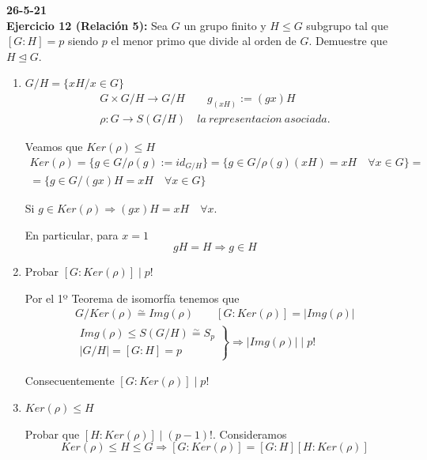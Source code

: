 \documentclass{article}
\begin{document}
\textbf{26-5-21} \\

\textbf{Ejercicio 12 (Relación 5):} Sea $G$ un grupo finito y $H\leq G$ subgrupo tal que $\left[G:H\right]=p$ siendo $p$ el menor primo que divide al orden de $G$. Demuestre que $H\unlhd G$.

\begin{enumerate}[1)]
\item $G/H=\{xH/x\in G\}$
\begin{gather*}
G\times G/H\longrightarrow G/H\qquad g_{(xH)}:=(gx)H \\
\rho:G\longrightarrow S(G/H) \quad la\:representacion\:asociada.
\end{gather*}

Veamos que $Ker(\rho)\leq H$
\begin{gather*}
Ker(\rho)=\{g\in G/\rho(g):=id_{G/H}\}=\{g\in G/\rho(g)(xH)=xH\quad \forall x\in G\}=\\
=\{g\in G/(gx)H=xH\quad \forall x\in G\}
\end{gather*}

Si $g\in Ker(\rho)\Rightarrow (gx)H=xH\quad \forall x$.

En particular, para $x=1$
\begin{equation*}
gH=H\Rightarrow g\in H
\end{equation*}

\item Probar $\left[G:Ker(\rho)\right]\mid p!$

Por el 1º Teorema de isomorfía tenemos que
\begin{gather*}
G/Ker(\rho)\overset{\sim}{=} Img(\rho) \qquad \left[G:Ker(\rho)\right]=|Img(\rho)| \\
\left.\begin{array}{c}
Img(\rho)\leq S(G/H)\overset{\sim}{=} S_p \\
|G/H|=\left[G:H\right]=p
\end{array} \right\rbrace \Rightarrow |Img(\rho)| \mid p!
\end{gather*}

Consecuentemente $\left[G:Ker(\rho)\right] \mid p!$

\item $Ker(\rho)\leq H$

Probar que $\left[H:Ker(\rho)\right] \mid (p-1)!$. Consideramos
\begin{equation*}
Ker(\rho)\leq H\leq G\Rightarrow \left[G:Ker(\rho)\right] = \left[G:H\right]\left[H:Ker(\rho)\right]
\end{equation*}


\end{enumerate}
\end{document}
